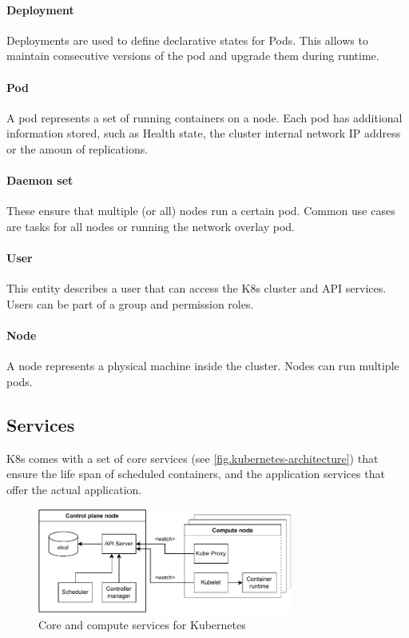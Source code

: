 \paragraph*{Deployment}
Deployments are used to define declarative states for Pods. This allows to maintain consecutive versions of the pod and upgrade them during runtime.
\paragraph*{Pod} A pod represents a set of running containers on a node. Each pod has additional information stored, such as Health state, the cluster internal network \ac{IP} address or the amoun of replications.
\paragraph*{Daemon set} These ensure that multiple (or all) nodes run a certain pod\cite{Kubernetes.20220831}. Common use cases are tasks for all nodes or running the network overlay pod.
\paragraph*{User} This entity describes a user that  can access the \ac{K8s} cluster and \ac{API} services. Users can be part of a group and permission roles.
\paragraph*{Node} A node represents a physical machine inside the cluster. Nodes can run multiple pods.


\subsection{Services}
\ac{K8s} comes with a set of core services (see \autoref{fig.kubernetes-architecture}) that ensure the life span of scheduled containers, and the application services that offer the actual application.
\begin{figure}[h]
	\centering
	\includegraphics[width=0.75\textwidth]{Figures/kubernetes-architecture.pdf}
	\caption{Core and compute services for Kubernetes\cite{Luksa.2018}}
	\label{fig.kubernetes-architecture}
\end{figure}

